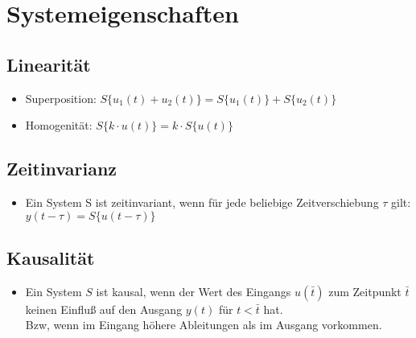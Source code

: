 \documentclass[german]{latex4ei/latex4ei_sheet}
\begin{document}
\section{Systemeigenschaften}
\begin{sectionbox}
    \subsection{Linearität}
    \vspace{1mm}
    \begin{itemize}
        \item Superposition: $S\{u_1(t) + u_2(t)\} = S\{u_1(t)\} + S\{u_2(t)\}$
        \item Homogenität: $S\{k \cdot u(t)\} = k \cdot S\{u(t)\}$
    \end{itemize}
    \subsection{Zeitinvarianz}
    \vspace{1mm}
    \begin{itemize}
        \item Ein System S ist zeitinvariant, wenn für jede beliebige Zeitverschiebung $τ$ gilt:
        $y(t −τ) = S\{u(t −τ)\}$
    \end{itemize}
    \subsection{Kausalität}
    \vspace{1mm}
    \begin{itemize}
        \item Ein System $S$ ist kausal, wenn der Wert des Eingangs $u(\bar{t})$ zum Zeitpunkt $\bar{t}$ keinen
        Einfluß auf den Ausgang $y(t)$ für $t < \bar{t}$ hat. \\
        Bzw, wenn im Eingang höhere Ableitungen als im Ausgang vorkommen.
    \end{itemize}


    
\end{sectionbox}
\end{document}
